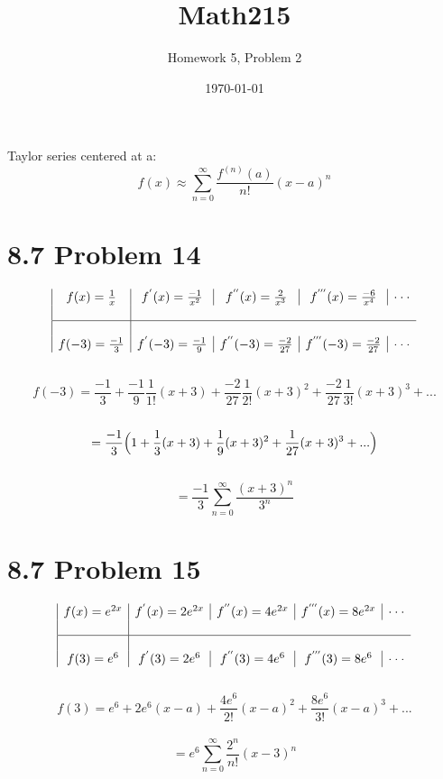 \documentclass{article} %
\title{Math215} %
\author{Homework 5, Problem 2} %
\date{\today}
\begin{document}
\maketitle %
Taylor series centered at a:\\ $$f(x) \approx \sum_{n=0}^{\infty}\frac{f^{(n)}(a)}{n!}(x-a)^{n}$$
\section*{8.7 Problem 14} %
\begin{displaymath}
  \begin{array}{|c|c|c|c|c}
    f(x)=\frac{1}{x} & f^{'}(x)=\frac{-1}{x^{2}} & f^{''}(x)=\frac{2}{x^{3}} & f^{'''}(x)=\frac{-6}{x^{4}} & \cdot\cdot\cdot\\
    \\
    \hline
    \\
    f(-3)=\frac{-1}{3} & f^{'}(-3)=\frac{-1}{9} & f^{''}(-3)=\frac{-2}{27} & f^{'''}(-3)=\frac{-2}{27} & \cdot\cdot\cdot\\
  \end{array}
\end{displaymath}
\\
$$f(-3) = \frac{-1}{3} + \frac{-1}{9}\frac{1}{1!}(x+3) + \frac{-2}{27}\frac{1}{2!}(x+3)^{2} + \frac{-2}{27}\frac{1}{3!}(x+3)^{3} + ...$$\\
$$= \frac{-1}{3}\Big{(}1 + \frac{1}{3}(x+3) + \frac{1}{9}(x+3)^{2} + \frac{1}{27}(x+3)^{3} + ...\Big{)}$$\\
$$= \frac{-1}{3}\sum_{n=0}^{\infty}\frac{(x+3)^{n}}{3^{n}}$$
\pagebreak
\section*{8.7 Problem 15}
\begin{displaymath}
  \begin{array}{|c|c|c|c|c}
    f(x)=e^{2x} & f^{'}(x)=2e^{2x} & f^{''}(x)=4e^{2x} & f^{'''}(x)=8e^{2x} & \cdot\cdot\cdot\\
    \\
    \hline
    \\
    f(3)=e^{6} & f^{'}(3)=2e^{6} & f^{''}(3)=4e^{6} & f^{'''}(3)=8e^{6} & \cdot\cdot\cdot\\
  \end{array}
\end{displaymath}  
\\
$$f(3)=e^{6} + 2e^{6}(x-a) + \frac{4e^{6}}{2!}(x-a)^{2} + \frac{8e^{6}}{3!}(x-a)^{3} + ...$$\\
$$= e^{6}\sum_{n=0}^{\infty} \frac{2^{n}}{n!}(x-3)^{n}$$
\end{document}
